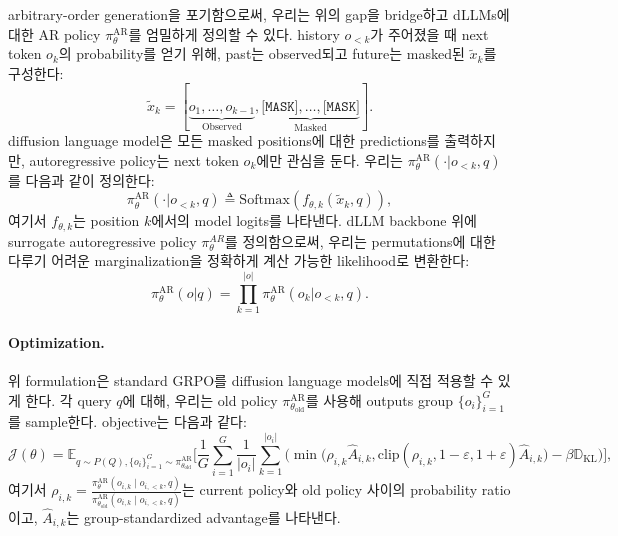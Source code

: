 arbitrary-order generation을 포기함으로써, 우리는 위의 gap을 bridge하고 dLLMs에 대한 AR policy $\pi_{\theta}^{\text{AR}}$를 엄밀하게 정의할 수 있다.
history $o_{<k}$가 주어졌을 때 next token $o_k$의 probability를 얻기 위해, past는 observed되고 future는 masked된 $\tilde{x}_k$를 구성한다:
\begin{equation}
    \tilde{x}_k = [\underbrace{o_1, \dots, o_{k-1}}_{\text{Observed}}, \underbrace{\texttt{[MASK]}, \dots, \texttt{[MASK]}}_{\text{Masked}}].
\end{equation}
diffusion language model은 모든 masked positions에 대한 predictions를 출력하지만, autoregressive policy는 next token $o_k$에만 관심을 둔다. 우리는 $\pi_{\theta}^{\text{AR}}(\cdot | o_{<k}, q)$를 다음과 같이 정의한다:
\begin{equation}
    \pi_{\theta}^{\text{AR}}(\cdot | o_{<k}, q) \triangleq \text{Softmax}(f_{\theta, k}(\tilde{x}_k, q)),
\end{equation}
여기서 $f_{\theta, k}$는 position $k$에서의 model logits를 나타낸다.
dLLM backbone 위에 surrogate autoregressive policy $\pi_{\theta}^{AR}$를 정의함으로써, 우리는 permutations에 대한 다루기 어려운 marginalization을 정확하게 계산 가능한 likelihood로 변환한다:
\begin{equation}
    \pi_{\theta}^{\text{AR}}(o | q) = \prod_{k=1}^{|o|} \pi_{\theta}^{\text{AR}}(o_k | o_{<k}, q).
\end{equation}

\paragraph{Optimization.}
위 formulation은 standard GRPO를 diffusion language models에 직접 적용할 수 있게 한다. 각 query $q$에 대해, 우리는 old policy $\pi_{\theta_{\text{old}}}^{\text{AR}}$를 사용해 outputs group $\{o_i\}_{i=1}^G$를 sample한다. objective는 다음과 같다:
\begin{equation}
    \label{eq:justgrpo-loss}
    \mathcal{J}(\theta) = \mathbb{E}_{q \sim P(Q), \{o_i\}_{i=1}^G \sim \pi_{\theta_{\text{old}}}^{\text{AR}}} \Bigg[ \frac{1}{G} \sum_{i=1}^G \frac{1}{|o_i|} \sum_{k=1}^{|o_i|} \Big( \min \big( \rho_{i,k} \hat{A}_{i,k}, \text{clip}(\rho_{i,k}, 1-\varepsilon, 1+\varepsilon) \hat{A}_{i,k} \big) - \beta \mathbb{D}_{\text{KL}} \Big) \Bigg],
\end{equation}
여기서 $\rho_{i,k} = \frac{\pi_\theta^{\text{AR}}(o_{i,k} \mid o_{i,<k}, q)}{\pi_{\theta_{\text{old}}}^{\text{AR}}(o_{i,k} \mid o_{i,<k}, q)}$는 current policy와 old policy 사이의 probability ratio이고, $\hat{A}_{i,k}$는 group-standardized advantage를 나타낸다.

